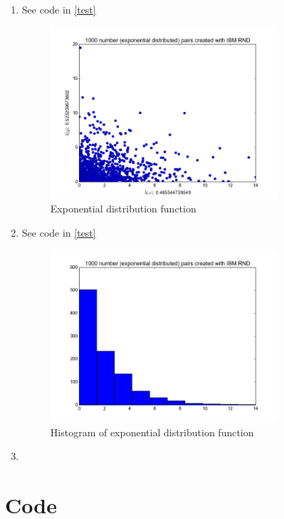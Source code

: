\documentclass[a4paper,12px]{article}
\begin{document}
\begin{enumerate}
    \item See code in \autoref{test}
        \begin{figure}[h!]
            \centering
            \includegraphics[width=0.8\textwidth]{exponential.png}
            \caption{Exponential distribution function}
            \label{fig:exponential}
        \end{figure}
    \FloatBarrier
    \item See code in \autoref{test}
        \begin{figure}[h!]
            \centering
            \includegraphics[width=0.8\textwidth]{histogram.png}
            \caption{Histogram of exponential distribution function}
            \label{fig:histogram}
        \end{figure}
    \FloatBarrier
    \item

\end{enumerate}
    \appendix
    \section{Code}
    \label{test}
        {\footnotesize\inputminted{python}{o34.py}}


% 
% 
\end{document}
